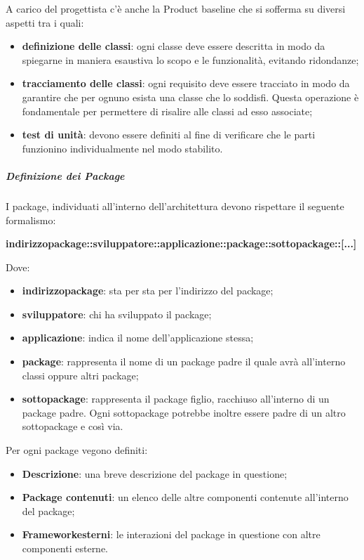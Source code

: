 			A carico del progettista c'è anche la Product baseline che si sofferma su diversi aspetti tra i quali:
			\begin{itemize}
				\item \textbf{definizione delle classi}: ogni classe deve essere descritta in modo da spiegarne in maniera esaustiva lo scopo e le funzionalità, evitando ridondanze;
				\item \textbf{tracciamento delle classi}: ogni requisito deve essere tracciato in modo da garantire che per ognuno esista una classe che lo soddisfi. Questa operazione è fondamentale per permettere di risalire alle classi ad esso associate;
				\item \textbf{test di unità}: devono essere definiti al fine di verificare che le parti funzionino individualmente nel modo stabilito.
			\end{itemize}
			\subparagraph{Definizione dei Package\glosp}
			I package, individuati all'interno dell'architettura devono rispettare il seguente formalismo:\newline \newline			\centerline{\textbf{indirizzo\textunderscore package::sviluppatore::applicazione::package::sottopackage::[...]}}\newline
			Dove:
			\begin{itemize}
			\item \textbf{indirizzo\textunderscore package}: sta per sta per l'indirizzo del package;
			\item \textbf{sviluppatore}: chi ha sviluppato il package;
			\item \textbf{applicazione}: indica il nome dell'applicazione stessa;
			\item \textbf{package}: rappresenta il nome di un package padre il quale avrà all'interno classi oppure altri package;
			\item \textbf{sottopackage}: rappresenta il package figlio, racchiuso all'interno di un package padre. Ogni sottopackage potrebbe inoltre essere padre di un altro sottopackage e così via.
			\end{itemize}
			Per ogni package vegono definiti:
			\begin{itemize}
			\item \textbf{Descrizione}: una breve descrizione del package in questione;
			\item \textbf{Package contenuti}: un elenco delle altre componenti contenute all'interno del package;
			\item \textbf{Framework\glosp esterni}: le interazioni del package in questione con altre componenti esterne.
			\end{itemize}
